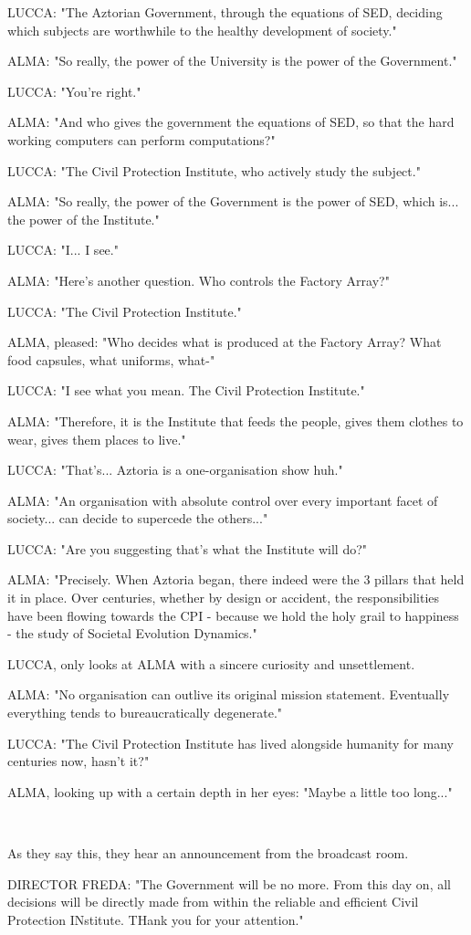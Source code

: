 \documentclass[11pt]{article}
\begin{document}
LUCCA: "The Aztorian Government, through the equations of SED, deciding which subjects are worthwhile to the healthy development of society."

ALMA: "So really, the power of the University is the power of the Government."

LUCCA: "You're right."

ALMA: "And who gives the government the equations of SED, so that the hard working computers can perform computations?"

LUCCA: "The Civil Protection Institute, who actively study the subject."

ALMA: "So really, the power of the Government is the power of SED, which is... the power of the Institute."

LUCCA: "I... I see."

ALMA: "Here's another question. 
Who controls the Factory Array?"

LUCCA: "The Civil Protection Institute."

ALMA, pleased: "Who decides what is produced at the Factory Array?
What food capsules, what uniforms, what-"

LUCCA: "I see what you mean. The Civil Protection Institute."

ALMA: "Therefore, it is the Institute that feeds the people, gives them clothes to wear, gives them places to live."

LUCCA: "That's... Aztoria is a one-organisation show huh."

ALMA: "An organisation with absolute control over every important facet of society... can decide to supercede the others..."

LUCCA: "Are you suggesting that's what the Institute will do?"

ALMA: "Precisely.
When Aztoria began, there indeed were the 3 pillars that held it in place. 
Over centuries, whether by design or accident, the responsibilities have been flowing towards the CPI - because we hold the holy grail to happiness - the study of Societal Evolution Dynamics."

LUCCA, only looks at ALMA with a sincere curiosity and unsettlement.

ALMA: "No organisation can outlive its original mission statement. Eventually everything tends to bureaucratically degenerate."

LUCCA: "The Civil Protection Institute has lived alongside humanity for many centuries now, hasn't it?"

ALMA, looking up with a certain depth in her eyes: "Maybe a little too long..."

\ 

As they say this, they hear an announcement from the broadcast room.

DIRECTOR FREDA: "The Government will be no more. 
From this day on, all decisions will be directly made from within the reliable and efficient Civil Protection INstitute.
THank you for your attention."
\end{document}
